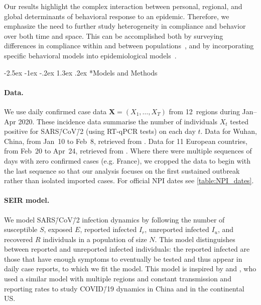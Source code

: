 \documentclass[12pt]{extarticle}
\makeatletter
\renewcommand\section{\@startsection {section}{1}{\z@}%
     {-2.5ex \@plus -1ex \@minus -.2ex}%
     {1.3ex \@plus.2ex}%
    {\Large\bfseries}}
\newcommand{\covid}{COVID\=/19 }
\newcommand{\sars}{SARS\=/CoV\=/2 }
\let\vec\mathbf
\makeatother
\begin{document}
Our results highlight the complex interaction between personal, regional, and global determinants of behavioral response to an epidemic.
Therefore, we emphasize the need to further study heterogeneity in compliance and behavior over both time and space. This can be accomplished both by surveying differences in compliance within and between populations~\citep{Atchison2020}, and by incorporating specific behavioral models into epidemiological models~\citep{Arthur2020,Fenichela2011,Walters2013}.



{\small
\section*{Models and Methods}



\paragraph*{Data.} 
We use daily confirmed case data $\vec{X}=(X_1, \ldots, X_T)$ from 12~regions during Jan--Apr 2020. These incidence data summarise the number of individuals $X_t$ tested positive for \sars (using RT-qPCR tests) on each day $t$. 
Data for Wuhan, China, from Jan~10 to Feb~8, retrieved from \citet{Pei2020}. Data for 11 European countries, from Feb~20 to Apr~24, retrieved from \citet{Flaxman2020}.
Where there were multiple sequences of days with zero confirmed cases (e.g. France), we cropped the data to begin with the last sequence so that our analysis focuses on the first sustained outbreak rather than isolated imported cases. 
For official NPI dates see \autoref{table:NPI_dates}.



\paragraph*{SEIR model.} \label{sec:model}
We model \sars infection dynamics by following the number of susceptible $S$, exposed $E$, reported infected $I_r$, unreported infected $I_u$, and recovered $R$ individuals in a population of size $N$.
This model distinguishes between reported and unreported infected individuals: the reported infected are those that have enough symptoms to eventually be tested and thus appear in daily case reports, to which we fit the model.
This model is inspired by \citet{Li2020} and \citet{Pei2020}, who used a similar model with multiple regions and constant transmission and reporting rates to study \covid dynamics in China and in the continental US.

}
\end{document}
